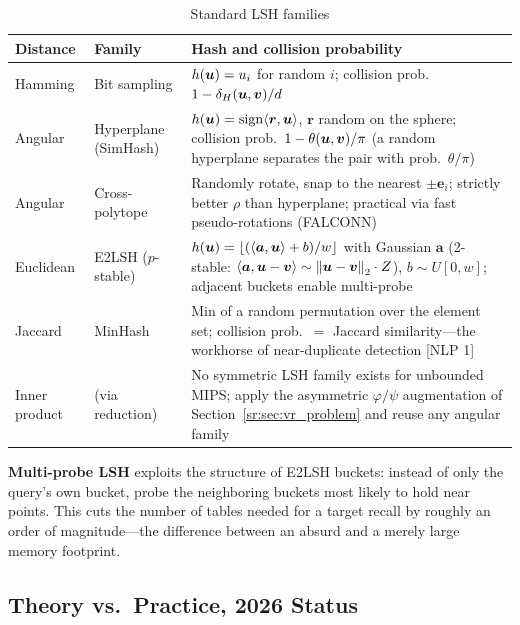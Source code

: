 \begin{table}[H]
\centering
\caption{Standard LSH families}
\label{sr:tab:lsh_families}
\begin{tabularx}{\textwidth}{llX}
\toprule
\textbf{Distance} & \textbf{Family} & \textbf{Hash and collision probability} \\
\midrule
Hamming & Bit sampling & $h(\bm{u}) = u_i$ for random $i$; collision prob.\ $1 - \delta_H(\bm{u},\bm{v})/d$ \\
Angular & Hyperplane (SimHash) & $h(\bm{u}) = \operatorname{sign}\langle\bm{r},\bm{u}\rangle$, $\bm{r}$ random on the sphere; collision prob.\ $1 - \theta(\bm{u},\bm{v})/\pi$ (a random hyperplane separates the pair with prob.\ $\theta/\pi$) \\
Angular & Cross-polytope & Randomly rotate, snap to the nearest $\pm \bm{e}_i$; strictly better $\rho$ than hyperplane; practical via fast pseudo-rotations (FALCONN) \\
Euclidean & E2LSH ($p$-stable) & $h(\bm{u}) = \lfloor (\langle\bm{a},\bm{u}\rangle + b)/w \rfloor$ with Gaussian $\bm{a}$ (2-stable: $\langle\bm{a},\bm{u}-\bm{v}\rangle \sim \left\lVert\bm{u}-\bm{v}\right\rVert_2 \cdot Z$), $b \sim U[0,w]$; adjacent buckets enable multi-probe \\
Jaccard & MinHash & Min of a random permutation over the element set; collision prob.\ $=$ Jaccard similarity---the workhorse of near-duplicate detection [NLP 1] \\
Inner product & (via reduction) & No symmetric LSH family exists for unbounded MIPS; apply the asymmetric $\varphi/\psi$ augmentation of Section~\ref{sr:sec:vr_problem} and reuse any angular family \\
\bottomrule
\end{tabularx}
\end{table}

\textbf{Multi-probe LSH} exploits the structure of E2LSH buckets: instead of only the query's own bucket, probe the neighboring buckets most likely to hold near points. This cuts the number of tables needed for a target recall by roughly an order of magnitude---the difference between an absurd and a merely large memory footprint.

\subsection{Theory vs.\ Practice, 2026 Status}

